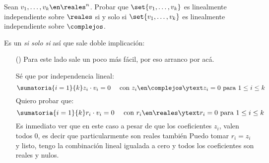 \begin{enunciado}{\ejercicio}
  Sean $v_1, \ldots, v_k \en \reales^n$. Probar que $\set{v_1, \ldots, v_k}$ es linealmente independiente sobre
  $\reales$ si y solo si $\set{v_1,\ldots,v_k}$ es linealmente independiente sobre $\complejos$.
\end{enunciado}

Es un \textit{si solo si} así que sale doble implicación:

\begin{itemize}
  \item[(\red{$\Leftarrow$})] Para este lado sale un poco más fácil, por eso arranco por acá.

        Sé que por independencia lineal:
        $$
          \sumatoria{i = 1}{k} z_i \cdot v_i = 0
          \quad
          \text{ con }
          z_i \en \complejos \ytext z_i = 0 \text{ para }  1 \leq i \leq k
        $$
        Quiero probar que:
        $$
          \sumatoria{i = 1}{k} r_i \cdot v_i = 0
          \quad
          \text{ con }
          r_i \en \reales \ytext r_i = 0 \text{ para }  1 \leq i \leq k
        $$
        Es inmediato ver que en este caso a pesar de que los coeficientes $z_i$, valen todos 0,
        es decir que particularmente son reales también\red{!} Puedo tomar $r_i = z_i$ y listo, tengo la combinación lineal
        igualada a cero y todos los coeficientes son reales y nulos.


\end{itemize}
